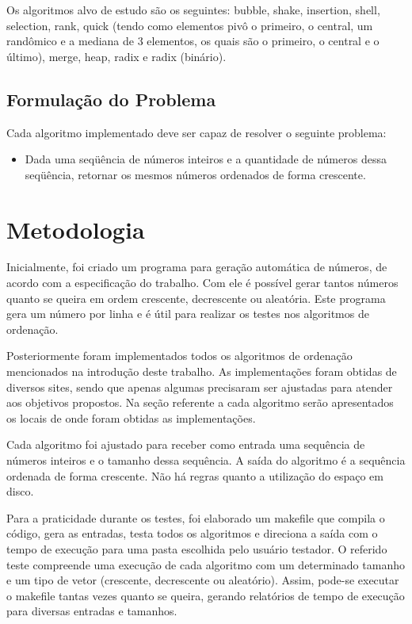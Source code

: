 \documentclass[12pt,a4paper]{article}
\begin{document}
Os algoritmos alvo de estudo são os seguintes: bubble, shake, insertion, shell, selection, rank, quick (tendo como elementos pivô o primeiro, o central, um randômico e a mediana de 3 elementos, os quais são o primeiro, o central e o último), merge, heap, radix e radix (binário).





\subsection{Formulação do Problema}
Cada algoritmo implementado deve ser capaz de resolver o seguinte problema: 

\begin{itemize}
\item Dada uma seqüência de números inteiros e a quantidade de números dessa seqüência, retornar os mesmos números ordenados de forma crescente.

\end{itemize}



\section{Metodologia}
Inicialmente, foi criado um programa para geração automática de números, de acordo com a especificação do trabalho. Com ele é possível gerar tantos números quanto se queira em ordem crescente, decrescente ou aleatória. Este programa gera um número por linha e é útil para realizar os testes nos algoritmos de ordenação.

Posteriormente foram implementados todos os algoritmos de ordenação mencionados na introdução deste trabalho. As implementações foram obtidas de diversos sites, sendo que apenas algumas precisaram ser ajustadas para atender aos objetivos propostos. Na seção referente a cada algoritmo serão apresentados os locais de onde foram obtidas as implementações.

Cada algoritmo foi ajustado para receber como entrada uma sequência de números inteiros e o tamanho dessa sequência. A saída do algoritmo é a sequência ordenada de forma crescente. Não há regras quanto a utilização do espaço em disco. 

Para a praticidade durante os testes, foi elaborado um makefile que compila o código, gera as entradas, testa todos os algoritmos e direciona a saída com o tempo de execução para uma pasta escolhida pelo usuário testador. O referido teste compreende uma execução de cada algoritmo com um determinado tamanho e um tipo de vetor (crescente, decrescente ou aleatório). Assim, pode-se executar o makefile tantas vezes quanto se queira, gerando relatórios de tempo de execução para diversas entradas e tamanhos.
\end{document}
